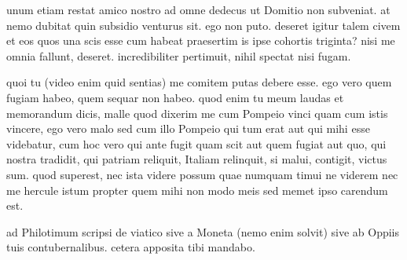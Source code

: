 


 unum etiam restat amico nostro ad omne dedecus ut Domitio non subveniat. at nemo dubitat quin subsidio venturus sit. ego non puto. deseret igitur talem civem et eos quos una scis esse cum habeat praesertim is ipse cohortis triginta? nisi me omnia fallunt, deseret. incredibiliter pertimuit, nihil spectat nisi fugam.

 quoi tu (video enim quid sentias) me comitem putas debere esse. ego vero quem fugiam habeo, quem sequar non habeo. quod enim tu meum laudas et memorandum dicis, malle quod dixerim me cum Pompeio vinci quam cum istis vincere, ego vero malo sed cum illo Pompeio qui tum erat aut qui mihi esse videbatur, cum hoc vero qui ante fugit quam scit aut quem fugiat aut quo, qui nostra tradidit, qui patriam reliquit, Italiam relinquit, si malui, contigit, victus sum. quod superest, nec ista videre possum quae numquam timui ne viderem nec me hercule istum propter quem mihi non modo meis sed memet ipso carendum est.

 ad Philotimum scripsi de viatico sive a Moneta (nemo enim solvit) sive ab Oppiis tuis contubernalibus. cetera apposita tibi mandabo.
